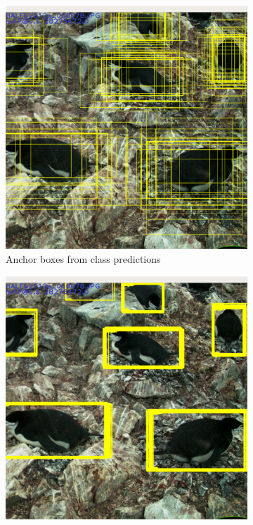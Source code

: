 \begin{figure}
  \centering
  \begin{subfigure}[t]{0.33\textwidth}
  \includegraphics[width=0.95\linewidth]{figures/object/anchors.png}
  \caption{Anchor boxes from class predictions}
  \end{subfigure}%
  \begin{subfigure}[t]{0.33\textwidth}
  \includegraphics[width=0.95\linewidth]{figures/object/predictions.png}

\end{subfigure}
\end{figure}
